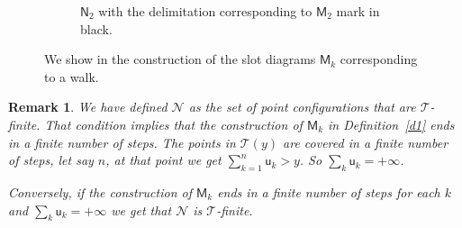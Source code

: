 \documentclass[12pt]{article}
\numberwithin{equation}{section}
\newtheorem{remark}[theorem]{Remark}
\newcommand{\cN}{\mathcal N}
\newcommand{\sM}{\mathsf{M}}
\newcommand{\sN}{\mathsf{N}}
\newcommand{\su}{{\mathsf{u}}}
\begin{document}
\begin{figure}
    
    \begin{subfigure}[b]{\textwidth}
\centering
{}

    \caption{$\sN_2$ with the delimitation corresponding to $\sM_2$ mark in black.}
    \end{subfigure}
    
    
\caption{We show in the construction of the slot diagrams $\sM_k$ corresponding to a walk.}
\label{Mk}
\end{figure}

\begin{remark}
\label{equivTfin}\rm
We have defined $\cN$ as the set of point configurations that are $\mathcal T$-finite.
That condition implies that the construction of $\sM_k$ in Definition~\ref{d1} ends in a finite number of steps.
The points in $\mathcal T(y)$ are covered in a finite number of steps, let say $n$, at that point we get $\sum_{k=1}^n\su_k>y$. So $\sum_{k}\su_k=+\infty$.

Conversely, if the construction of $\sM_k$ ends in a finite number of steps for each $k$ and $\sum_{k}\su_k=+\infty$ we get that 
$\cN$ is $\mathcal T$-finite.
\end{remark}
\end{document}
